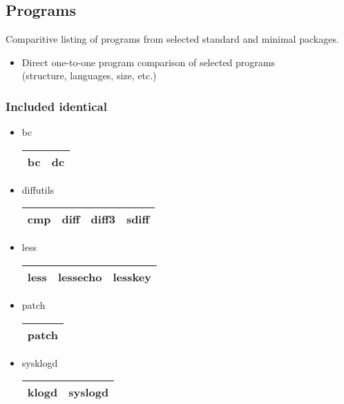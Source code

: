 \subsection{Programs}\label{Programs}

Comparitive listing of programs from selected standard and minimal packages.

\begin{itemize}
    \item Direct one-to-one program comparison of selected programs \\(structure, languages, size, etc.)
\end{itemize}

\newpage

\subsubsection{Included identical}

\begin{itemize}
    \item bc
        \begin{center}
            \begin{tabular}{|c|c|}
                \hline
                bc & dc \\
                \hline
            \end{tabular}
        \end{center}
    \item diffutils
        \begin{center}
            \begin{tabular}{|c|c|c|c|}
                \hline
                cmp & diff & diff3 & sdiff \\
                \hline
            \end{tabular}
        \end{center}
    \item less
        \begin{center}
            \begin{tabular}{|c|c|c|}
                \hline
                less & lessecho & lesskey \\
                \hline
            \end{tabular}
        \end{center}
    \item patch
        \begin{center}
            \begin{tabular}{|c|}
                \hline
                patch \\
                \hline
            \end{tabular}
        \end{center}
    \item sysklogd
        \begin{center}
            \begin{tabular}{|c|c|}
                \hline
                klogd & syslogd \\
                \hline
            \end{tabular}
        \end{center}
\end{itemize}


